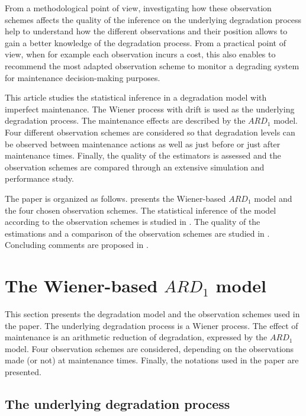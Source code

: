 From a methodological point of view, investigating how these observation schemes affects the quality of the inference on the underlying degradation process help to understand how the different observations and their position allows to gain a better knowledge of the degradation process. From a practical point of view, when for example each observation incurs a cost, this also enables to recommend the most adapted observation scheme to monitor a degrading system for maintenance decision-making purposes.

This article studies the statistical inference in a degradation model with imperfect maintenance. The Wiener process with drift is used as the underlying degradation process. The maintenance effects are described by the $ARD_1$ model. Four different observation schemes are considered so that degradation levels can be observed between maintenance actions as well as just before or just after maintenance times. Finally, the quality of the estimators is assessed and the observation schemes are compared through an extensive simulation and performance study. 


The paper is organized as follows.   presents the Wiener-based $ARD_1$ model and the four chosen observation schemes. The statistical inference of the model according to the observation schemes is studied in . The quality of the estimations and a comparison of the observation schemes are studied in . Concluding comments are proposed in .



\section{The Wiener-based $ARD_1$ model}
\label{section:model}

This section presents the degradation model and the observation schemes used in the paper. The underlying degradation process is a Wiener process. The effect of maintenance is an arithmetic reduction of degradation, expressed by the $ARD_1$ model. Four observation schemes are considered, depending on the observations made (or not) at maintenance times. Finally, the notations used in the paper are presented.

\subsection{The underlying degradation process} 
\label{section:Wiener}

